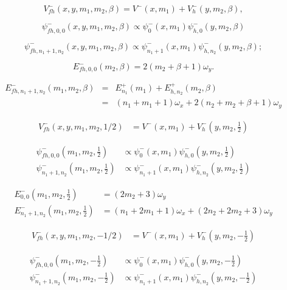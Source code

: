 \documentclass[12pt]{article}
\begin{document}
\begin{equation}\label{GFHP-}
	V^-_{fh}(x,y,m_1,m_2,\beta)=V^-(x,m_1)+V^-_h (y,m_2,\beta),
\end{equation}

\begin{equation}
\psi^-_{fh,0,0}(x,y,m_1,m_2,\beta)\propto\psi^-_0 (x,m_1)\psi^-_{h,0}(y,m_2,\beta)
\end{equation}

\begin{equation}
\psi^-_{fh,n_1+1,n_2}(x,y,m_1,m_2,\beta)\propto\psi^-_{n_1+1} (x,m_1)\psi^-_{h,n_2}(y,m_2,\beta);	
\end{equation}

\begin{equation}\label{fhg}
	E^-_{fh,0,0}(m_2,\beta)=2(m_2+\beta+1)\omega_y.
\end{equation}

\begin{eqnarray}\label{fhexct}
	E^-_{fh,n_1+1,n_2}(m_1,m_2,\beta)&=& E^+_{n_1}(m_1)+E^+_{h,n_2}(m_2,\beta)\nonumber\\
	&=& (n_1+m_1+1)\omega_x+2(n_2+m_2+\beta+1)\omega_y		
\end{eqnarray}

\begin{align}
    V^-_{fh}(x,y,m_1,m_2,1/2) &= V^-(x,m_1)+V_h^-(y,m_2,\frac{1}{2})
\end{align}

\begin{align}
    \psi^-_{fh,0,0}(m_1,m_2,\frac{1}{2}) &\propto \psi^-_0 (x,m_1)\psi^-_{h,0}(y,m_2,\frac{1}{2})
    \\ 
    \psi^-_{n_1+1,n_2}(m_1,m_2,\frac{1}{2}) &\propto \psi^-_{n_1+1} (x,m_1)\psi^-_{h,n_2}(y,m_2,\frac{1}{2})
\end{align}

\begin{align} 
    E^-_{0,0}(m_1,m_2,\frac{1}{2}) &=\left(2m_2+3\right)\omega_y\\
    E^-_{n_1+1,n_2}(m_1,m_2,\frac{1}{2}) &= \left(n_1+2m_1+1\right)\omega_x+ \left(2n_2+2m_2+3\right)\omega_y
\end{align}

\begin{align}
	V^-_{fh}(x,y,m_1,m_2,-1/2) &= V^-(x,m_1)+V_h^-(y,m_2,-\frac{1}{2})
\end{align}

\begin{align}
	\psi^-_{fh,0,0}(m_1,m_2,-\frac{1}{2}) &\propto \psi^-_0 (x,m_1)\psi^-_{h,0}(y,m_2,-\frac{1}{2})  \\ 
	\psi^-_{n_1+1,n_2}(m_1,m_2,-\frac{1}{2}) &\propto \psi^-_{n_1+1} (x,m_1)\psi^-_{h,n_2}(y,m_2,-\frac{1}{2})
\end{align}
\end{document}
